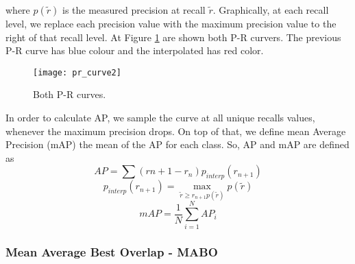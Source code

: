 where $p(\tilde{r})$ is the measured precision at recall $\tilde{r}$. Graphically, at each recall level, we replace each precision value
with the maximum precision value to the right of that recall level.  At Figure \ref{fig:pr_curve2} are shown both P-R curvers. The previous P-R curve has blue
colour and the interpolated has red color.

\begin{figure}[h]
  \centering
  \texttt{[image: pr\_curve2]}
  \caption{Both P-R curves. }
  \label{fig:pr_curve2}
\end{figure}

In order to calculate AP, we sample the curve at all unique recalls values, whenever the maximum precision drops. On top of that, we define mean Average Precision (mAP)
the mean of the AP for each class. So, AP and mAP are defined as
\[  AP = \sum (r{n+1} - r_n) p_{interp} (r_{n+1}) \]
\[ p_{interp}(r_{n+1}) = \max_{\tilde{r} \ge r_{n+1} p(\tilde{r})}p(\tilde{r}) \]
\[ mAP = \frac{1}{N} \sum_{i=1}^N AP_i \]



\subsubsection{Mean Average Best Overlap - MABO}

